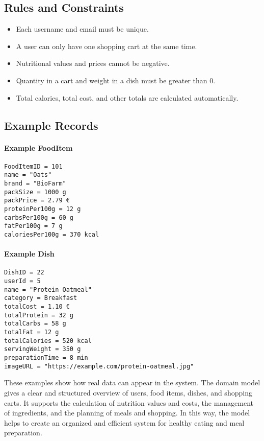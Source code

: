 \documentclass[11pt]{article}
\begin{document}
\subsection*{Rules and Constraints}

\begin{itemize}
    \item Each username and email must be unique.
    \item A user can only have one shopping cart at the same time.
    \item Nutritional values and prices cannot be negative.
    \item Quantity in a cart and weight in a dish must be greater than 0.
    \item Total calories, total cost, and other totals are calculated automatically.
\end{itemize}

\subsection*{Example Records}

\paragraph{Example FoodItem}
\begin{verbatim}
FoodItemID = 101
name = "Oats"
brand = "BioFarm"
packSize = 1000 g
packPrice = 2.79 €
proteinPer100g = 12 g
carbsPer100g = 60 g
fatPer100g = 7 g
caloriesPer100g = 370 kcal
\end{verbatim}

\paragraph{Example Dish}
\begin{verbatim}
DishID = 22
userId = 5
name = "Protein Oatmeal"
category = Breakfast
totalCost = 1.10 €
totalProtein = 32 g
totalCarbs = 58 g
totalFat = 12 g
totalCalories = 520 kcal
servingWeight = 350 g
preparationTime = 8 min
imageURL = "https://example.com/protein-oatmeal.jpg"
\end{verbatim}

These examples show how real data can appear in the system.
The domain model gives a clear and structured overview of users, food items, dishes, and shopping carts.
It supports the calculation of nutrition values and costs, the management of ingredients, and the planning of meals and shopping.
In this way, the model helps to create an organized and efficient system for healthy eating and meal preparation.
\end{document}
